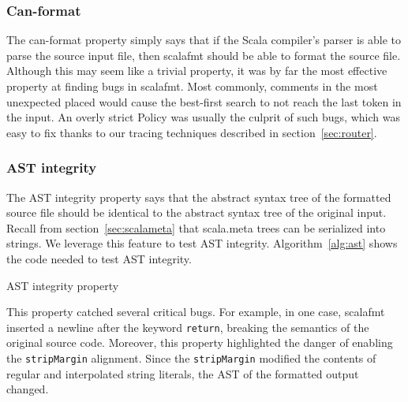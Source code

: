 \subsubsection{Can-format}
The can-format property simply says that if the Scala compiler's parser is able to parse the source input file, then scalafmt should be able to format the source file.
Although this may seem like a trivial property, it was by far the most effective property at finding bugs in scalafmt.
Most commonly, comments in the most unexpected placed would cause the best-first search to not reach the last token in the input.
An overly strict Policy was usually the culprit of such bugs, which was easy to fix thanks to our tracing techniques described in section~\ref{sec:router}.

\subsubsection{AST integrity}
The AST integrity property says that the abstract syntax tree of the formatted source file should be identical to the abstract syntax tree of the original input.
Recall from section~\ref{sec:scalameta} that scala.meta trees can be serialized into strings.
We leverage this feature to test AST integrity.
Algorithm~\ref{alg:ast} shows the code needed to test AST integrity.
\begin{algorithm}
  \caption{AST integrity property}\label{alg:ast}
  
\end{algorithm}
This property catched several critical bugs.
For example, in one case, scalafmt inserted a newline after the keyword \texttt{return}, breaking the semantics of the original source code.
Moreover, this property highlighted the danger of enabling the \texttt{stripMargin} alignment.
Since the \texttt{stripMargin} modified the contents of regular and interpolated string literals,
the AST of the formatted output changed.

